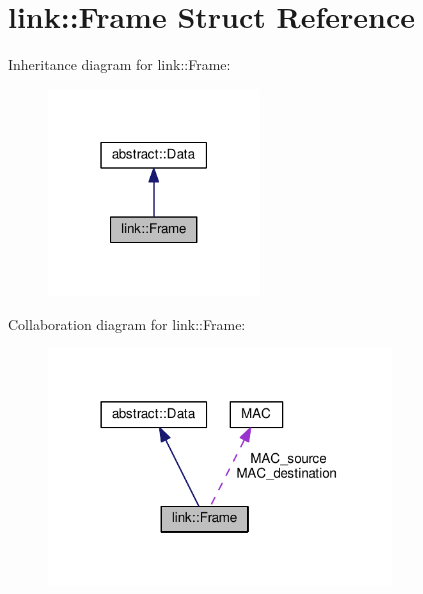 \hypertarget{structlink_1_1Frame}{}\section{link\+:\+:Frame Struct Reference}
\label{structlink_1_1Frame}


Inheritance diagram for link\+:\+:Frame\+:\nopagebreak
\begin{figure}[H]
\begin{center}
\leavevmode
\includegraphics[width=159pt]{structlink_1_1Frame__inherit__graph}
\end{center}
\end{figure}


Collaboration diagram for link\+:\+:Frame\+:\nopagebreak
\begin{figure}[H]
\begin{center}
\leavevmode
\includegraphics[width=258pt]{structlink_1_1Frame__coll__graph}
\end{center}
\end{figure}
